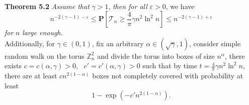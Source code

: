 \documentclass[
11pt, %
a4paper, %
oneside, %
headinclude,footinclude, %
BCOR5mm, %
]{scrartcl}
\begin{document}
\vspace{0.6em}\\\textbf{Theorem 5.2} \textit{Assume that} $\gamma>1$, \textit{then for all} $\varepsilon>0$, we have
\begin{equation}
    n^{-2(\gamma-1)-\varepsilon} \leq \mathbf{P}\left[\mathcal{T}_n \geq  \frac{4}{\pi}\gamma n^2\ln^2n \right] \leq n^{-2(\gamma-1)+\varepsilon} \tag{5.7}
\end{equation}
\textit{for} $n$ \textit{large enough.}
\vspace{0.6em}\\Additionally, for $\gamma \in (0,1)$, fix an arbitrary $\alpha \in (\sqrt{\gamma},1)$, consider simple random walk on the torus $\mathbb{Z}_n^2$ and divide the torus into boxes of size $n^\alpha$, there exists $c=c(\alpha,\gamma)>0$, \ $c'=c'(\alpha,\gamma)>0$ such that by time $t=\frac{4}{\pi}\gamma n^2\ln^2n$, there are at least $cn^{2(1-\alpha)}$ boxes not completely covered with probability at least 
\begin{equation}
    1-\exp\left(-c'n^{2(1-\alpha)}\right). \tag{5.8}
\end{equation}
\end{document}
